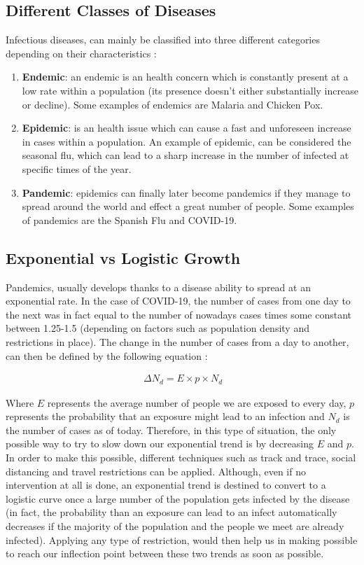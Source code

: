 \subsection{Different Classes of Diseases}
Infectious diseases, can mainly be classified into three different categories depending on their characteristics \cite{2minclass}:
\begin{enumerate}
    \item \textbf{Endemic}: an endemic is an health concern which is constantly present at a low rate within a population (its presence doesn't either substantially increase or decline). Some examples of endemics are Malaria and Chicken Pox.
    \item \textbf{Epidemic}: is an health issue which can cause a fast and unforeseen increase in cases within a population. An example of epidemic, can be considered the seasonal flu, which can lead to a sharp increase in the number of infected at specific times of the year.
    \item \textbf{Pandemic}: epidemics can finally later become pandemics if they manage to spread around the world and effect a great number of people. Some examples of pandemics are the Spanish Flu and COVID-19.
\end{enumerate}

\subsection{Exponential vs Logistic Growth}
\label{explog}
Pandemics, usually develops thanks to a disease ability to spread at an exponential rate. In the case of COVID-19, the number of cases from one day to the next was in fact equal to the number of nowadays cases times some constant between 1.25-1.5 (depending on factors such as population density and restrictions in place). The change in the number of cases from a day to another, can then be defined by the following equation \cite{exponentials}:

\useshortskip
\begin{align}
\ \Delta N_{d} = E \times p \times N_{d}
\label{n_new}
\end{align}
\useshortskip

Where $E$ represents the average number of people we are exposed to every day, $p$ represents the probability that an exposure might lead to an infection and $N_{d}$ is the number of cases as of today. Therefore, in this type of situation, the only possible way to try to slow down our exponential trend is by decreasing $E$ and $p$. In order to make this possible, different techniques such as track and trace, social distancing and travel restrictions can be applied. Although, even if no intervention at all is done, an exponential trend is destined to convert to a logistic curve once a large number of the population gets infected by the disease (in fact, the probability than an exposure can lead to an infect automatically decreases if the majority of the population and the people we meet are already infected). Applying any type of restriction, would then help us in making possible to reach our inflection point between these two trends as soon as possible.

